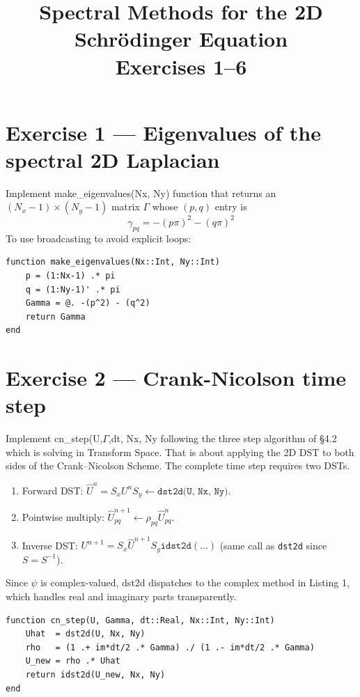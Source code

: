 \documentclass[11pt,a4paper]{article}
\title{\textbf{Spectral Methods for the 2D Schr\"{o}dinger Equation}\\
\large Exercises 1--6}
\author{}
\date{}
\begin{document}
\maketitle

\section{Exercise 1 — Eigenvalues of the spectral 2D Laplacian}

Implement make\_eigenvalues(Nx, Ny) function that returns an $(N_x-1)\times(N_y-1)$ matrix $\Gamma$ whose $(p,q)$ entry is
\[
  \gamma_{pq} = -(p\pi)^2 - (q\pi)^2
\]
To use broadcasting to avoid explicit loops:

\begin{lstlisting}
function make_eigenvalues(Nx::Int, Ny::Int)
    p = (1:Nx-1) .* pi
    q = (1:Ny-1)' .* pi
    Gamma = @. -(p^2) - (q^2)
    return Gamma
end
\end{lstlisting}

\section{Exercise 2 — Crank-Nicolson time step}

Implement cn\_step(U,$\Gamma$,dt, Nx, Ny following the three step algorithm of §4.2 which is solving in Transform Space. That is about applying the 2D DST to both sides of the Crank–Nicolson Scheme.
The complete time step requires two DSTs.
\begin{enumerate}
  \item Forward DST: $\hat{U}^n = S_xU^nS_y \leftarrow \texttt{dst2d(U, Nx, Ny)}$.
  \item Pointwise multiply: $\hat{U}^{n+1}_{pq} \leftarrow \rho_{pq} \hat{U}_{pq} ^n$.
  \item Inverse DST: $U^{n+1} = S_x\hat{U}^{n+1} S_y \texttt{idst2d}(...)$
        (same call as \texttt{dst2d} since $S = S^{-1}$).
\end{enumerate}

Since $\psi$ is complex-valued, dst2d dispatches to the complex method in Listing 1, which handles
real and imaginary parts transparently.

\begin{lstlisting}
function cn_step(U, Gamma, dt::Real, Nx::Int, Ny::Int)
    Uhat  = dst2d(U, Nx, Ny)
    rho   = (1 .+ im*dt/2 .* Gamma) ./ (1 .- im*dt/2 .* Gamma)
    U_new = rho .* Uhat
    return idst2d(U_new, Nx, Ny)
end
\end{lstlisting}
\end{document}
